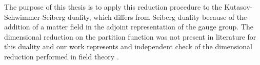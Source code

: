 \documentclass[a4paper,12pt]{article}
\begin{document}
The purpose of this thesis is to apply this reduction procedure to the Kutasov-Schwimmer-Seiberg duality, which differs from Seiberg duality because of the addition of a matter field in the adjoint representation of the gauge group.
The dimensional reduction on the partition function was not present in literature for this duality and our work represents and independent check of the dimensional reduction performed in field theory .
\end{document}
